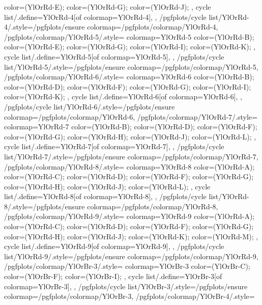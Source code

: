 {{{      color=(YlOrRd-E);
      color=(YlOrRd-G);
      color=(YlOrRd-J);
    },
    cycle list/.define={YlOrRd-4}{[of colormap=YlOrRd-4]},
  },
  /pgfplots/cycle list/YlOrRd-4/.style={/pgfplots/ensure colormap={/pgfplots/colormap/YlOrRd-4}},
  /pgfplots/colormap/YlOrRd-5/.style={
    colormap={YlOrRd-5}{
      color=(YlOrRd-B);
      color=(YlOrRd-E);
      color=(YlOrRd-G);
      color=(YlOrRd-I);
      color=(YlOrRd-K);
    },
    cycle list/.define={YlOrRd-5}{[of colormap=YlOrRd-5]},
  },
  /pgfplots/cycle list/YlOrRd-5/.style={/pgfplots/ensure colormap={/pgfplots/colormap/YlOrRd-5}},
  /pgfplots/colormap/YlOrRd-6/.style={
    colormap={YlOrRd-6}{
      color=(YlOrRd-B);
      color=(YlOrRd-D);
      color=(YlOrRd-F);
      color=(YlOrRd-G);
      color=(YlOrRd-I);
      color=(YlOrRd-K);
    },
    cycle list/.define={YlOrRd-6}{[of colormap=YlOrRd-6]},
  },
  /pgfplots/cycle list/YlOrRd-6/.style={/pgfplots/ensure colormap={/pgfplots/colormap/YlOrRd-6}},
  /pgfplots/colormap/YlOrRd-7/.style={
    colormap={YlOrRd-7}{
      color=(YlOrRd-B);
      color=(YlOrRd-D);
      color=(YlOrRd-F);
      color=(YlOrRd-G);
      color=(YlOrRd-H);
      color=(YlOrRd-J);
      color=(YlOrRd-L);
    },
    cycle list/.define={YlOrRd-7}{[of colormap=YlOrRd-7]},
  },
  /pgfplots/cycle list/YlOrRd-7/.style={/pgfplots/ensure colormap={/pgfplots/colormap/YlOrRd-7}},
  /pgfplots/colormap/YlOrRd-8/.style={
    colormap={YlOrRd-8}{
      color=(YlOrRd-A);
      color=(YlOrRd-C);
      color=(YlOrRd-D);
      color=(YlOrRd-F);
      color=(YlOrRd-G);
      color=(YlOrRd-H);
      color=(YlOrRd-J);
      color=(YlOrRd-L);
    },
    cycle list/.define={YlOrRd-8}{[of colormap=YlOrRd-8]},
  },
  /pgfplots/cycle list/YlOrRd-8/.style={/pgfplots/ensure colormap={/pgfplots/colormap/YlOrRd-8}},
  /pgfplots/colormap/YlOrRd-9/.style={
    colormap={YlOrRd-9}{
      color=(YlOrRd-A);
      color=(YlOrRd-C);
      color=(YlOrRd-D);
      color=(YlOrRd-F);
      color=(YlOrRd-G);
      color=(YlOrRd-H);
      color=(YlOrRd-J);
      color=(YlOrRd-K);
      color=(YlOrRd-M);
    },
    cycle list/.define={YlOrRd-9}{[of colormap=YlOrRd-9]},
  },
  /pgfplots/cycle list/YlOrRd-9/.style={/pgfplots/ensure colormap={/pgfplots/colormap/YlOrRd-9}},
  /pgfplots/colormap/YlOrBr-3/.style={
    colormap={YlOrBr-3}{
      color=(YlOrBr-C);
      color=(YlOrBr-F);
      color=(YlOrBr-I);
    },
    cycle list/.define={YlOrBr-3}{[of colormap=YlOrBr-3]},
  },
  /pgfplots/cycle list/YlOrBr-3/.style={/pgfplots/ensure colormap={/pgfplots/colormap/YlOrBr-3}},
  /pgfplots/colormap/YlOrBr-4/.style={
}}
